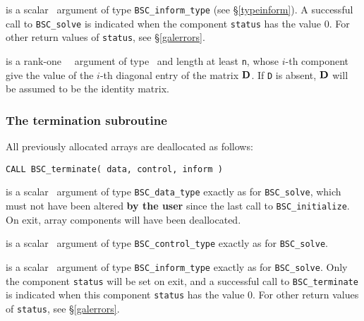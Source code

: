 \documentclass{galahad}
\newcommand{\packagename}{BSC}
\begin{document}
\begin{description}
 is a scalar \intentout\ argument of type 
{\tt \packagename\_inform\_type}
(see \S\ref{typeinform}). A successful call to
{\tt \packagename\_solve}
is indicated when the  component {\tt status} has the value 0. 
For other return values of {\tt status}, see \S\ref{galerrors}.

 is a rank-one \optional\ \intentin\ argument of type \realdp\
and length at least {\tt n}, whose $i$-th component give the value of the 
$i$-th diagonal entry of the matrix ${\mathbf{D}}$. If {\tt D} is absent, ${\mathbf{D}}$
will be assumed to be the identity matrix.

\end{description}


\subsubsection{The  termination subroutine}
All previously allocated arrays are deallocated as follows:
\vspace*{1mm}

\hspace{8mm}
{\tt CALL \packagename\_terminate( data, control, inform )}

\begin{description}

 is a scalar \intentinout\ argument of type 
{\tt \packagename\_data\_type} 
exactly as for
{\tt \packagename\_solve},
which must not have been altered {\bf by the user} since the last call to 
{\tt \packagename\_initialize}.
On exit, array components will have been deallocated.

 is a scalar \intentin\ argument of type 
{\tt \packagename\_control\_type}
exactly as for
{\tt \packagename\_solve}.

 is a scalar \intentout\ argument of type
{\tt \packagename\_inform\_type}
exactly as for
{\tt \packagename\_solve}.
Only the component {\tt status} will be set on exit, and a 
successful call to 
{\tt \packagename\_terminate}
is indicated when this  component {\tt status} has the value 0. 
For other return values of {\tt status}, see \S\ref{galerrors}.

\end{description}

\end{document}
